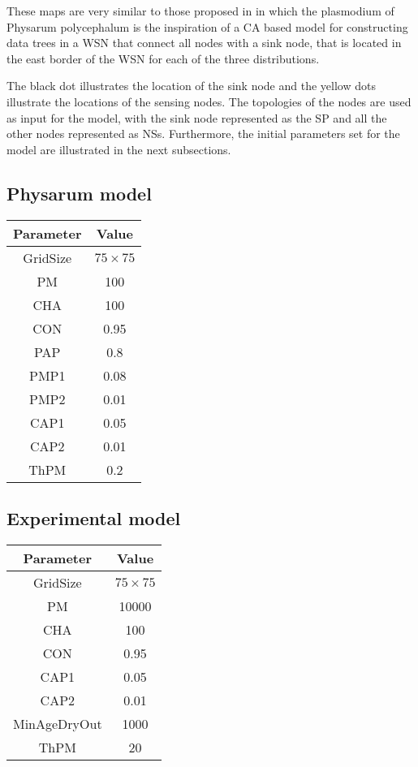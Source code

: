 These maps are very similar to those proposed in \cite{tsompanas2015cellular} in which the plasmodium of Physarum polycephalum is the inspiration of a CA based model for constructing data trees in a WSN that connect all nodes with a sink node, that is located in the east border of the WSN for each of the three distributions.

\par
The black dot illustrates the location of the sink node and the yellow dots illustrate the locations of the sensing nodes. The topologies of the nodes are used as input for the model, with the sink node represented as the SP and all the other nodes represented as NSs. Furthermore, the initial parameters set for the model are illustrated in the next subsections.

\subsection{Physarum model}

\begin{center}
 \begin{tabular}{||c c||} 
 \hline
 Parameter & Value \\ [0.5ex] 
 \hline\hline
 GridSize & $75 \times 75$ \\ 
 \hline
 PM & 100 \\ 
 \hline
 CHA & 100 \\ 
 \hline
 CON & 0.95 \\ 
 \hline
 PAP & 0.8 \\ 
 \hline
 PMP1 & 0.08 \\ 
 \hline
 PMP2 & 0.01 \\ 
 \hline
 CAP1 & 0.05 \\ 
 \hline
 CAP2 & 0.01 \\ 
 \hline
 ThPM & 0.2 \\ [1ex] 
 \hline
 \end{tabular}
\end{center}

\subsection{Experimental model}

\begin{center}
 \begin{tabular}{||c c||} 
 \hline
 Parameter & Value \\ [0.5ex] 
 \hline\hline
 GridSize & $75 \times 75$ \\ 
 \hline
 PM & 10000 \\ 
 \hline
 CHA & 100 \\ 
 \hline
 CON & 0.95 \\ 
 \hline
 CAP1 & 0.05 \\ 
 \hline
 CAP2 & 0.01 \\ 
 \hline
 MinAgeDryOut & 1000 \\
 \hline
 ThPM & 20 \\ [1ex] 
 \hline
 \end{tabular}
\end{center}

